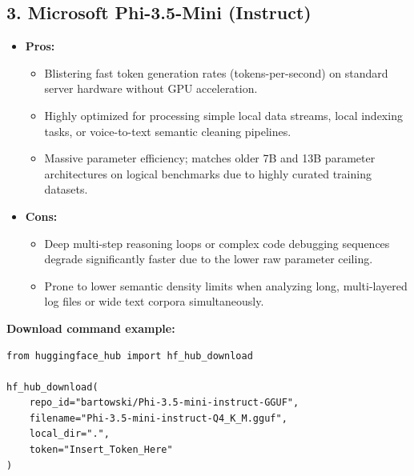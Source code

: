 \documentclass{article}
\begin{document}
\subsection*{3. Microsoft Phi-3.5-Mini (Instruct)}
\begin{itemize}
    \item \textbf{Pros:}
    \begin{itemize}
        \item Blistering fast token generation rates (tokens-per-second) on standard server hardware without GPU acceleration.
        \item Highly optimized for processing simple local data streams, local indexing tasks, or voice-to-text semantic cleaning pipelines.
        \item Massive parameter efficiency; matches older 7B and 13B parameter architectures on logical benchmarks due to highly curated training datasets.
    \end{itemize}
    \item \textbf{Cons:}
    \begin{itemize}
        \item Deep multi-step reasoning loops or complex code debugging sequences degrade significantly faster due to the lower raw parameter ceiling.
        \item Prone to lower semantic density limits when analyzing long, multi-layered log files or wide text corpora simultaneously.
    \end{itemize}

\end{itemize}

\noindent\textbf{Download command example:}
\begin{verbatim}
from huggingface_hub import hf_hub_download

hf_hub_download(
    repo_id="bartowski/Phi-3.5-mini-instruct-GGUF",
    filename="Phi-3.5-mini-instruct-Q4_K_M.gguf",
    local_dir=".",
    token="Insert_Token_Here"
)
\end{verbatim}
\end{document}
